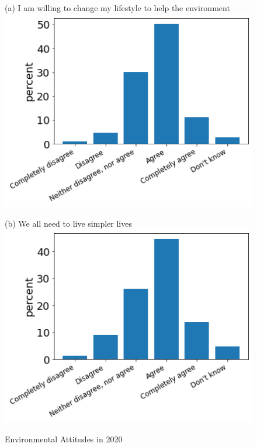 \documentclass[12pt]{article}
\begin{document}
\begin{figure}[h!!]
	\centering	
	\caption{Environmental Attitudes in 2020}\label{fig:opinions}	
	\begin{minipage}[h!!]{0.32\textwidth}  
		\centering\footnotesize{(a) I am willing to change my lifestyle to help the environment}
		\includegraphics[width=1\textwidth]{../codding_data/results/liss/qk20a175title0.png}
	\end{minipage}
	\begin{minipage}[h!!]{0.32\textwidth}
		\centering\footnotesize{(b) We all need to live simpler lives}
		\includegraphics[width=1\textwidth]{../codding_data/results/liss/qk20a181title0.png}

\end{minipage}
\end{figure}
\end{document}
